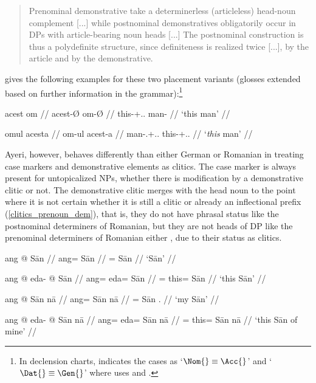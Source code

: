 \blockcquote[297]{dindelegan2013}{Prenominal demonstrative \sic{} take a
determinerless (articleless) head-noun complement [...] while postnominal
demonstratives obligatorily occur in DPs with article-bearing noun heads [...]
The postnominal construction is thus a polydefinite structure, since
definiteness is realized twice [...], by the article and by the demonstrative.}

\citet[297]{dindelegan2013} gives the following examples for these two
placement variants (glosses extended based on further information in the
grammar):\footnote{In declension charts, \citet{dindelegan2013} indicates the
cases as `$\Nom{}\equiv\Acc{}$' and `$\Dat{}\equiv\Gen{}$' where
\citet{lyons1999} uses \Pri{} and \Obl{}.}

\pex
	\a {}%
	\begingl
		\gla acest om //
		\glb acest-Ø om-Ø //
		\glc this-\Nom{}+\Acc{}.\Sg{}.\M{} man-\Sg{} //
		\glft `this man' //
	\endgl

	\a \begingl
		\gla omul acesta //
		\glb om-ul acest-a //
		\glc man-\Def{}.\Nom{}+\Acc{}.\Sg{}.\M{} 
			this-\Nom{}+\Acc{}.\Sg{}.\M{} //
		\glft `\emph{this} man' //
	\endgl
\xe

Ayeri, however, behaves differently than either German or Romanian in treating
case markers and demonstrative elements as clitics. The case marker is always
present for untopicalized NPs, whether there is modification by a demonstrative
clitic or not. The demonstrative clitic merges with the head noun to the point
where it is not certain whether it is still a clitic or already an inflectional
prefix (\autoref{clitics_prenoun_dem}), that is, they do not have phrasal
status like the postnominal determiners of Romanian, but they are not heads of
DP like the prenominal determiners of Romanian either 
\citep[299]{dindelegan2013}, due to their status as clitics.

\pex\label{ex:ayericasenoart}
	\a
	\begingl
		\gla ang @ Sān //
		\glb ang= Sān //
		\glc \Aarg{}= Sān //
		\glft `Sān' //
	\endgl

	\a\begingl
		\gla ang @ eda- @ Sān //
		\glb ang= eda= Sān //
		\glc \Aarg{}= this= Sān //
		\glft `this Sān' //
	\endgl

	\a\label{ex:naaadj}\begingl
		\gla ang @ Sān nā //
		\glb ang= Sān nā //
		\glc \Aarg{}= Sān \Fsg{}.\Gen{} //
		\glft `my Sān' //
	\endgl

	\a\ljudge\ques\begingl
		\gla ang @ eda- @ Sān nā //
		\glb ang= eda= Sān nā //
		\glc \Aarg{}= this= Sān nā //
		\glft `this Sān of mine' //
	\endgl
\xe

